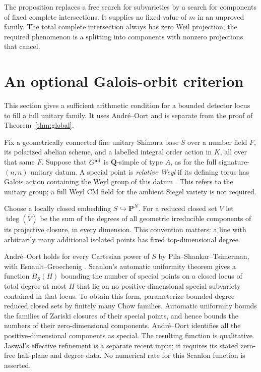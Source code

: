 \documentclass[11pt]{article}
\theoremstyle{definition}
\theoremstyle{remark}
\newcommand{\Q}{\mathbf Q}
\begin{document}
The proposition replaces a free search for subvarieties by a search for components of fixed complete intersections. It supplies no fixed value of $m$ in an unproved family. The total complete intersection always has zero Weil projection; the required phenomenon is a splitting into components with nonzero projections that cancel.

\section{An optional Galois-orbit criterion}
\label{sec:galois}
This section gives a sufficient arithmetic condition for a bounded detector locus to fill a full unitary family. It uses Andr\'e--Oort and is separate from the proof of Theorem~\ref{thm:global}.

Fix a geometrically connected fine unitary Shimura base $S$ over a number field $F$, its polarized abelian scheme, and a labelled integral order action in $K$, all over that same $F$. Suppose that $G^{\rm ad}$ is $\Q$-simple of type $A$, as for the full signature-$(n,n)$ unitary datum. A special point is \emph{relative Weyl} if its defining torus has Galois action containing the Weyl group of this datum \cite[Definitions~5.3--5.4]{ChaiOort}. This refers to the unitary group; a full Weyl CM field for the ambient Siegel variety is not required.

Choose a locally closed embedding $S\hookrightarrow\mathbf P^N$. For a reduced closed set $V$ let $\operatorname{tdeg}(\overline V)$ be the sum of the degrees of all geometric irreducible components of its projective closure, in every dimension. This convention matters: a line with arbitrarily many additional isolated points has fixed top-dimensional degree.

Andr\'e--Oort holds for every Cartesian power of $S$ by
Pila--Shankar--Tsimerman, with Esnault--Groechenig
\cite[Theorem~1.1]{PSTFull}. Scanlon's automatic uniformity theorem \cite[Theorem~4.2]{Scanlon} gives a function $B_S(H)$ bounding the number of special points on a closed locus of total degree at most $H$ that lie on no positive-dimensional special subvariety contained in that locus. To obtain this form, parameterize bounded-degree reduced closed sets by finitely many Chow families. Automatic uniformity bounds the families of Zariski closures of their special points, and hence bounds the numbers of their zero-dimensional components. Andr\'e--Oort identifies all the positive-dimensional components as special. The resulting function is qualitative. Jaswal's effective refinement
\cite[Theorem~1.1(ii)]{JaswalEffective} is a separate recent input;
it requires its stated zero-free half-plane and degree data. No
numerical rate for this Scanlon function is asserted.
\end{document}

